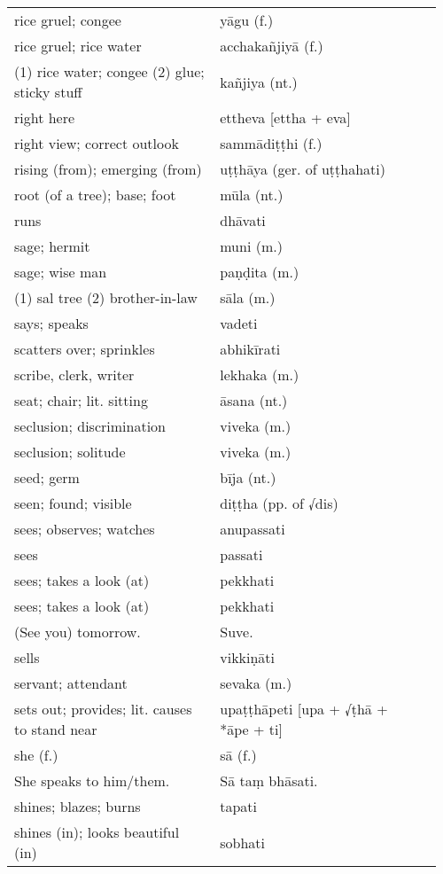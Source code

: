 \documentclass[a5paper]{memoir}
\begin{document}
\begin{longtable}{L{0.48\linewidth} L{0.48\linewidth} H}
rice gruel; congee & yāgu (f.) & \\[0pt]
rice gruel; rice water & acchakañjiyā (f.) & \\[0pt]
(1) rice water; congee (2) glue; sticky stuff & kañjiya (nt.) & \\[0pt]
right here & ettheva [ettha + eva] & \\[0pt]
right view; correct outlook & sammādiṭṭhi (f.) & \\[0pt]
rising (from); emerging (from) & uṭṭhāya (ger. of uṭṭhahati) & \\[0pt]
root (of a tree); base; foot & mūla (nt.) & \\[0pt]
runs & dhāvati & \\[0pt]
sage; hermit & muni (m.) & \\[0pt]
sage; wise man & paṇḍita (m.) & \\[0pt]
(1) sal tree (2) brother-in-law & sāla (m.) & \\[0pt]
says; speaks & vadeti & \\[0pt]
scatters over; sprinkles & abhikīrati & \\[0pt]
scribe, clerk, writer & lekhaka (m.) & \\[0pt]
seat; chair; lit. sitting & āsana (nt.) & \\[0pt]
seclusion; discrimination & viveka (m.) & \\[0pt]
seclusion; solitude & viveka (m.) & \\[0pt]
seed; germ & bīja (nt.) & \\[0pt]
seen; found; visible & diṭṭha (pp. of √dis) & \\[0pt]
sees; observes; watches & anupassati & \\[0pt]
sees & passati & \\[0pt]
sees; takes a look (at) & pekkhati & \\[0pt]
sees; takes a look (at) & pekkhati & \\[0pt]
(See you) tomorrow. & Suve. & \\[0pt]
sells & vikkiṇāti & \\[0pt]
servant; attendant & sevaka (m.) & \\[0pt]
sets out; provides; lit. causes to stand near & upaṭṭhāpeti [upa + √ṭhā + *āpe + ti] & \\[0pt]
she (f.) & sā (f.) & \\[0pt]
She speaks to him/them. & Sā taṃ bhāsati. & \\[0pt]
shines; blazes; burns & tapati & \\[0pt]
shines (in); looks beautiful (in) & sobhati & \\[0pt]

\end{longtable}
\end{document}

